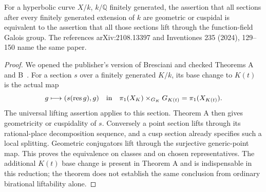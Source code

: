 \begin{proposition}
\label{F-cuspidalization}
For a hyperbolic curve $X/k$, $k/\mathbb Q$ finitely generated,
the assertion that all sections after every finitely generated
extension of $k$ are geometric or cuspidal is equivalent to the
assertion that all those sections lift through the function-field
Galois group. The references arXiv:2108.13397 and Inventiones
235 (2024), 129--150 name the same paper.
\end{proposition}
\begin{proof}
We opened the publisher's version of Bresciani and checked
Theorems A and B~\cite{F-BrescianiBirational}. For a section $s$
over a finitely generated $K/k$, its base change to $K(t)$ is
the actual map
\[
 g\longmapsto(s(\operatorname{res}g),g)
 \quad\hbox{in}\quad
 \pi_1(X_K)\times_{G_K}G_{K(t)}=\pi_1(X_{K(t)}).
\]
The universal lifting assertion applies to this section. Theorem A
then gives geometricity or cuspidality of $s$. Conversely a point
section lifts through its rational-place decomposition sequence,
and a cusp section already specifies such a local splitting.
Geometric conjugators lift through the surjective generic-point
map. This proves the equivalence on classes and on chosen
representatives. The additional $K(t)$ base change is present in
Theorem A and is indispensable in this reduction; the theorem
does not establish the same conclusion from ordinary birational
liftability alone.
\end{proof}


